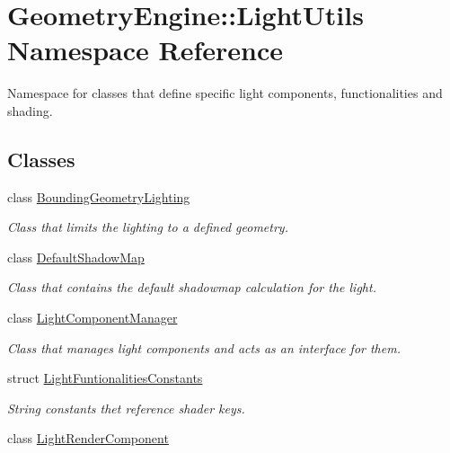 \hypertarget{namespace_geometry_engine_1_1_light_utils}{}\section{Geometry\+Engine\+::Light\+Utils Namespace Reference}
\label{namespace_geometry_engine_1_1_light_utils}


Namespace for classes that define specific light components, functionalities and shading.  


\subsection*{Classes}
\begin{DoxyCompactItemize}
\item 
class \mbox{\hyperlink{class_geometry_engine_1_1_light_utils_1_1_bounding_geometry_lighting}{Bounding\+Geometry\+Lighting}}
\begin{DoxyCompactList}\small\item\em Class that limits the lighting to a defined geometry. \end{DoxyCompactList}\item 
class \mbox{\hyperlink{class_geometry_engine_1_1_light_utils_1_1_default_shadow_map}{Default\+Shadow\+Map}}
\begin{DoxyCompactList}\small\item\em Class that contains the default shadowmap calculation for the light. \end{DoxyCompactList}\item 
class \mbox{\hyperlink{class_geometry_engine_1_1_light_utils_1_1_light_component_manager}{Light\+Component\+Manager}}
\begin{DoxyCompactList}\small\item\em Class that manages light components and acts as an interface for them. \end{DoxyCompactList}\item 
struct \mbox{\hyperlink{struct_geometry_engine_1_1_light_utils_1_1_light_funtionalities_constants}{Light\+Funtionalities\+Constants}}
\begin{DoxyCompactList}\small\item\em String constants thet reference shader keys. \end{DoxyCompactList}\item 
class \mbox{\hyperlink{class_geometry_engine_1_1_light_utils_1_1_light_render_component}{Light\+Render\+Component}}

\end{DoxyCompactItemize}
